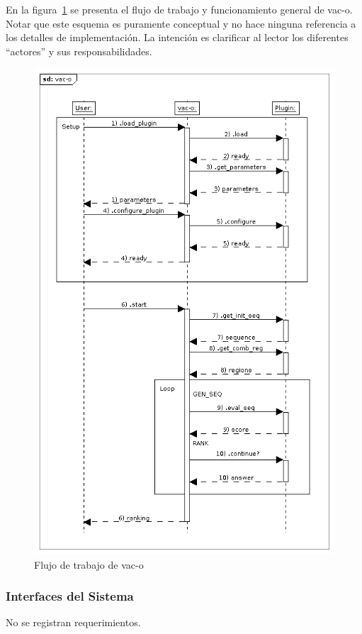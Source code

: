 \documentclass[10pt,a4paper]{article}
\begin{document}
    En la figura~\ref{fig:1} se presenta el flujo de trabajo y funcionamiento general de vac-o. Notar que este esquema es puramente conceptual y no hace ninguna referencia a los detalles de implementaci\'on. La intenci\'on es clarificar al lector los diferentes ``actores'' y sus responsabilidades.
    \begin{figure}
	    \centering
	    \includegraphics[scale=0.65]{seq-diagram.png}
	    \caption{Flujo de trabajo de vac-o}
	    \label{fig:1}
    \end{figure}

    \subsubsection{Interfaces del Sistema}
    No se registran requerimientos.
\end{document}
